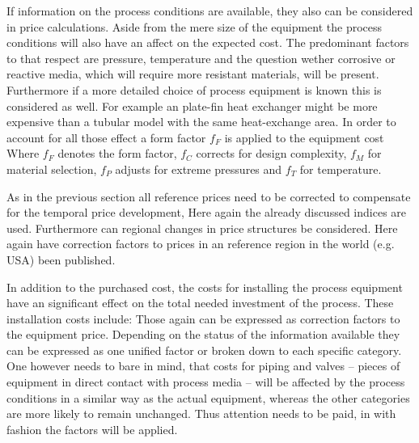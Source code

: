 If information on the process conditions are available, they also can be considered in price calculations.  
Aside from the mere size of the equipment the process conditions will also have an affect on the expected 
cost. The predominant factors to that respect are pressure, temperature and the question wether corrosive 
or reactive media, which will require more resistant materials, will be present. Furthermore if a more
detailed choice of process equipment is known this is considered as well. For example an plate-fin heat 
exchanger might be more expensive than a tubular model with the same heat-exchange area. 
In order to account for all those effect a form factor $f_F$ is applied to the equipment cost 
%
Where $f_F$ denotes the form factor, $f_C$ corrects for design complexity, $f_M$ for material selection, 
$f_P$ adjusts for extreme pressures and $f_T$ for temperature. 

As in the previous section all reference prices need to be corrected to compensate for the temporal price
development, Here again the already discussed indices are used. Furthermore can regional changes 
in price structures be considered. Here again have correction factors to prices in an reference region in 
the world (e.g. USA) been published.

In addition to the purchased cost, the costs for installing the process equipment have an significant effect 
on the total needed investment of the process. These installation costs include:
%
Those again can be expressed as correction factors to the equipment price. Depending on the status 
of the information available they can be expressed as one unified factor or broken down to each specific 
category. One however needs to bare in mind, that costs for piping and valves -- pieces of equipment
in direct contact with process media -- will be affected by the process conditions in a similar  
way as the actual equipment, whereas the other categories are more likely to remain unchanged. Thus
attention needs to be paid, in with fashion the factors will be applied. 

